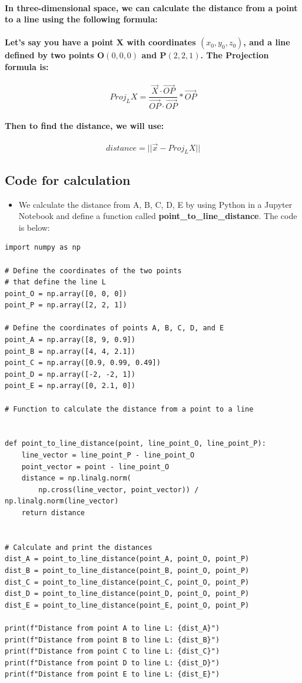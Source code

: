 \documentclass[11pt]{article} %
\begin{document}
\paragraph{In three-dimensional space, we can calculate the distance from a point to a line using the following formula:}
\paragraph{Let's say you have a point X with coordinates $(x_0, y_0, z_0)$, and a line defined by two points O$(0,0,0)$ and P$(2,2,1)$. The Projection formula is:}
% 
$$ Proj_{L}X = \frac{\vec{X} \cdot \vec{OP}}{\vec{OP} \cdot \vec{OP}} * \vec{OP} $$
% 
\paragraph{Then to find the distance, we will use:}

$$
    distance = ||\vec{x} - Proj_{L}X||
$$
% 

% 
% 
\subsection{Code for calculation}
\begin{itemize}
    \item We calculate the distance from A, B, C, D, E by using Python in a Jupyter Notebook and define a function called \textbf{point\_to\_line\_distance}. The code is below: 
\end{itemize}
% 
% 
% 
\begin{lstlisting}[style=pystyle]
import numpy as np

# Define the coordinates of the two points 
# that define the line L
point_O = np.array([0, 0, 0])
point_P = np.array([2, 2, 1])

# Define the coordinates of points A, B, C, D, and E
point_A = np.array([8, 9, 0.9])
point_B = np.array([4, 4, 2.1])
point_C = np.array([0.9, 0.99, 0.49])
point_D = np.array([-2, -2, 1])
point_E = np.array([0, 2.1, 0])

# Function to calculate the distance from a point to a line


def point_to_line_distance(point, line_point_O, line_point_P):
    line_vector = line_point_P - line_point_O
    point_vector = point - line_point_O
    distance = np.linalg.norm(
        np.cross(line_vector, point_vector)) / np.linalg.norm(line_vector)
    return distance


# Calculate and print the distances
dist_A = point_to_line_distance(point_A, point_O, point_P)
dist_B = point_to_line_distance(point_B, point_O, point_P)
dist_C = point_to_line_distance(point_C, point_O, point_P)
dist_D = point_to_line_distance(point_D, point_O, point_P)
dist_E = point_to_line_distance(point_E, point_O, point_P)

print(f"Distance from point A to line L: {dist_A}")
print(f"Distance from point B to line L: {dist_B}")
print(f"Distance from point C to line L: {dist_C}")
print(f"Distance from point D to line L: {dist_D}")
print(f"Distance from point E to line L: {dist_E}")
\end{lstlisting}
\end{document}
